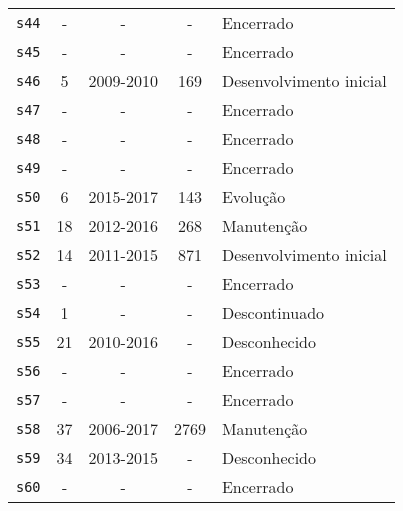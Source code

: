 \begin{longtable}{ l c c c l }
    \texttt{s44} & - & - & - & Encerrado \\
    \texttt{s45} & - & - & - & Encerrado \\
    \texttt{s46} & 5 & 2009-2010 & 169 & Desenvolvimento inicial \\
    \texttt{s47} & - & - & - & Encerrado \\
    \texttt{s48} & - & - & - & Encerrado \\
    \texttt{s49} & - & - & - & Encerrado \\
    \texttt{s50} & 6 & 2015-2017 & 143 & Evolução \\
    \texttt{s51} & 18 & 2012-2016 & 268 & Manutenção \\
    \texttt{s52} & 14 & 2011-2015 & 871 & Desenvolvimento inicial \\
    \texttt{s53} & - & - & - & Encerrado \\
    \texttt{s54} & 1 & - & - & Descontinuado \\
    \texttt{s55} & 21 & 2010-2016 & - & Desconhecido \\
    \texttt{s56} & - & - & - & Encerrado \\
    \texttt{s57} & - & - & - & Encerrado \\
    \texttt{s58} & 37 & 2006-2017 & 2769 & Manutenção \\
    \texttt{s59} & 34 & 2013-2015 & - & Desconhecido \\
    \texttt{s60} & - & - & - & Encerrado \\
\end{longtable}
